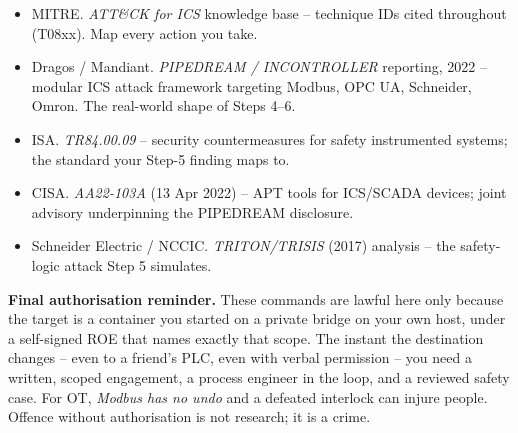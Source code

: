 \documentclass[11pt,a4paper]{article}
\begin{document}
\begin{notebox}
\begin{itemize}\setlength{\itemsep}{1pt}
  \item MITRE. \emph{ATT\&CK for ICS} knowledge base -- technique IDs
        cited throughout (T08xx). Map every action you take.
  \item Dragos / Mandiant. \emph{PIPEDREAM / INCONTROLLER} reporting,
        2022 -- modular ICS attack framework targeting Modbus,
        OPC UA, Schneider, Omron. The real-world shape of Steps 4--6.
  \item ISA. \emph{TR84.00.09} -- security countermeasures for safety
        instrumented systems; the standard your Step-5 finding maps to.
  \item CISA. \emph{AA22-103A} (13 Apr 2022) -- APT tools for ICS/SCADA
        devices; joint advisory underpinning the PIPEDREAM disclosure.
  \item Schneider Electric / NCCIC. \emph{TRITON/TRISIS} (2017)
        analysis -- the safety-logic attack Step 5 simulates.
\end{itemize}
\end{notebox}

\begin{warnbox}
\textbf{Final authorisation reminder.} These commands are lawful here
only because the target is a container you started on a private bridge
on your own host, under a self-signed ROE that names exactly that
scope. The instant the destination changes -- even to a friend's PLC,
even with verbal permission -- you need a written, scoped engagement,
a process engineer in the loop, and a reviewed safety case. For OT,
\emph{Modbus has no undo} and a defeated interlock can injure people.
Offence without authorisation is not research; it is a crime.
\end{warnbox}
\end{document}
